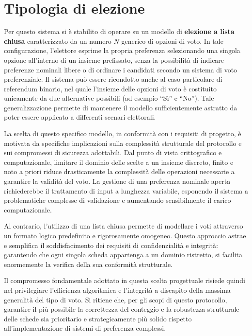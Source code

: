\section{Tipologia di elezione}
\label{sec:1.1_tipologia_elezione}

Per questo sistema si è stabilito di operare su un modello di \textbf{elezione a lista chiusa} caratterizzato da un numero $N$ generico di opzioni di voto. In tale configurazione, l'elettore esprime la propria preferenza selezionando una singola opzione all'interno di un insieme prefissato, senza la possibilità di indicare preferenze nominali libere o di ordinare i candidati secondo un sistema di voto preferenziale. 
Il sistema può essere ricondotto anche al caso particolare di referendum binario, nel quale l'insieme delle opzioni di voto è costituito unicamente da due alternative possibili (ad esempio ``Sì'' e ``No''). Tale generalizzazione permette di mantenere il modello sufficientemente astratto da poter essere applicato a differenti scenari elettorali.

La scelta di questo specifico modello, in conformità con i requisiti di progetto, è motivata da specifiche implicazioni sulla complessità strutturale del protocollo e sui compromessi di sicurezza adottabili. Dal punto di vista crittografico e computazionale, limitare il dominio delle scelte a un insieme discreto, finito e noto a priori riduce drasticamente la complessità delle operazioni necessarie a garantire la validità del voto. La gestione di una preferenza nominale aperta richiederebbe il trattamento di input a lunghezza variabile, esponendo il sistema a problematiche complesse di validazione e aumentando sensibilmente il carico computazionale.  

Al contrario, l'utilizzo di una lista chiusa permette di modellare i voti attraverso un formato logico predefinito e rigorosamente omogeneo. Questo approccio astrae e semplifica il soddisfacimento dei requisiti di confidenzialità e integrità: garantendo che ogni singola scheda appartenga a un dominio ristretto, si facilita enormemente la verifica della sua conformità strutturale.

Il compromesso fondamentale adottato in questa scelta progettuale risiede quindi nel privilegiare l'efficienza algoritmica e l'integrità a discapito della massima generalità del tipo di voto. Si ritiene che, per gli scopi di questo protocollo, garantire il più possibile la correttezza del conteggio e la robustezza strutturale delle schede sia prioritario e strategicamente più solido rispetto all'implementazione di sistemi di preferenza complessi.



